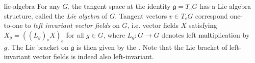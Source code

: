 \begin{example}{lie-algebra}
    For any  $G$, the tangent space at the identity $\mathfrak{g} = T_e G$ has a Lie algebra structure, called the \textit{Lie algebra} of $G$. Tangent vectors $v \in T_e G$ correspond one-to-one to \textit{left invariant vector fields} on $G$, i.e. vector fields $X$ satisfying $X_g = ((L_g)_* X)_e$ for all $g \in G$, where $L_g : G \to G$ denotes left multiplication by $g$. The Lie bracket on $\mathfrak{g}$ is then given by the . Note that the Lie bracket of left-invariant vector fields is indeed also left-invariant.
\end{example}
